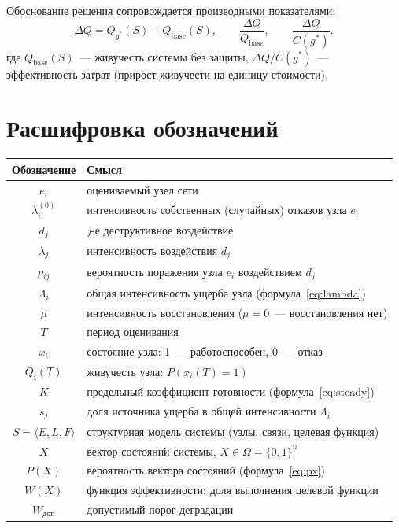 \documentclass[12pt]{article}
\begin{document}
Обоснование решения сопровождается производными показателями:
\begin{equation}
\Delta Q = Q_{g^{*}}(S) - Q_{\text{base}}(S), \qquad
\frac{\Delta Q}{Q_{\text{base}}}, \qquad
\frac{\Delta Q}{C(g^{*})},
\label{eq:deltaq}
\end{equation}
где $Q_{\text{base}}(S)$~--- живучесть системы без защиты, $\Delta Q /
C(g^{*})$~--- эффективность затрат (прирост живучести на единицу стоимости).

\section{Расшифровка обозначений}

\begin{center}
\begin{tabular}{|c|l|}
\hline
Обозначение & Смысл \\
\hline
$e_i$ & оцениваемый узел сети \\
$\lambda_i^{(0)}$ & интенсивность собственных (случайных) отказов узла $e_i$ \\
$d_j$ & $j$-е деструктивное воздействие \\
$\lambda_j$ & интенсивность воздействия $d_j$ \\
$p_{ij}$ & вероятность поражения узла $e_i$ воздействием $d_j$ \\
$\Lambda_i$ & общая интенсивность ущерба узла (формула~\eqref{eq:lambda}) \\
$\mu$ & интенсивность восстановления ($\mu = 0$~--- восстановления нет) \\
$T$ & период оценивания \\
$x_i$ & состояние узла: 1~--- работоспособен, 0~--- отказ \\
$Q_i(T)$ & живучесть узла: $P(x_i(T) = 1)$ \\
$K$ & предельный коэффициент готовности (формула~\eqref{eq:steady}) \\
$s_j$ & доля источника ущерба в общей интенсивности $\Lambda_i$ \\
\hline
$S = \langle E, L, F \rangle$ & структурная модель системы (узлы, связи, целевая функция) \\
$X$ & вектор состояний системы, $X \in \Omega = \{0, 1\}^n$ \\
$P(X)$ & вероятность вектора состояний (формула~\eqref{eq:px}) \\
$W(X)$ & функция эффективности: доля выполнения целевой функции \\
$W_{\text{доп}}$ & допустимый порог деградации \\

\end{tabular}
\end{center}
\end{document}
